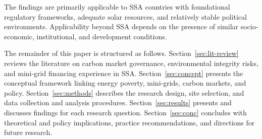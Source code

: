 The findings are primarily applicable to SSA countries with foundational regulatory frameworks, adequate solar resources, and relatively stable political environments. Applicability beyond SSA depends on the presence of similar socio-economic, institutional, and development conditions.

The remainder of this paper is structured as follows. Section~\ref{sec:lit-review} reviews the literature on carbon market governance, environmental integrity risks, and mini-grid financing experience in SSA. Section~\ref{sec:concept} presents the conceptual framework linking energy poverty, mini-grids, carbon markets, and policy. Section~\ref{sec:methods} describes the research design, site selection, and data collection and analysis procedures. Section~\ref{sec:results} presents and discusses findings for each research question. Section~\ref{sec:conc} concludes with theoretical and policy implications, practice recommendations, and directions for future research.